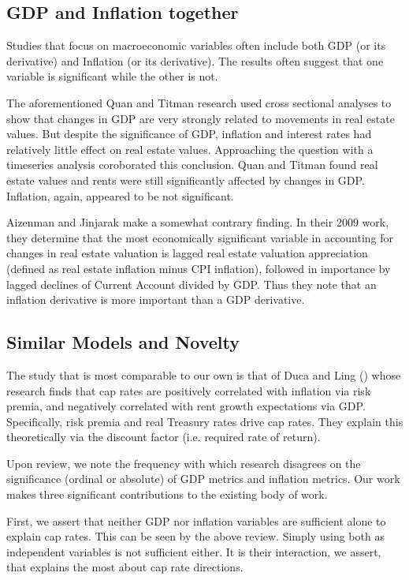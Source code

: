 \subsection{GDP and Inflation together}

Studies that focus on macroeconomic variables often include both GDP (or its derivative) and Inflation (or its derivative). The results often suggest that one variable is significant while the other is not. 

The aforementioned Quan and Titman research used cross sectional analyses to show that changes in GDP are very strongly related to movements in real estate values. But despite the significance of GDP, inflation and interest rates had relatively little effect on real estate values. Approaching the question with a timeseries analysis coroborated this conclusion. Quan and Titman found real estate values and rents were still significantly affected by changes in GDP. Inflation, again, appeared to be not significant. 

Aizenman and Jinjarak make a somewhat contrary finding. In their 2009 work, \citep*{aizenman2009current} they determine that the most economically significant variable in accounting for changes in real estate valuation is lagged real estate valuation appreciation (defined as real estate inflation minus CPI inflation), followed in importance by lagged declines of Current Account divided by GDP. Thus they note that an inflation derivative is more important than a GDP derivative. 

\subsection{Similar Models and Novelty}

The study that is most comparable to our own is that of Duca and Ling (\citeyear{duca2017taxes}) whose research finds that cap rates are positively correlated with inflation via risk premia, and negatively correlated with rent growth expectations via GDP. Specifically, risk premia and real Treasury rates drive cap rates. They explain this theoretically via the discount factor (i.e. required rate of return).

Upon review, we note the frequency with which research disagrees on the significance (ordinal or absolute) of GDP metrics and inflation metrics. Our work makes three significant contributions to the existing body of work. 

First, we assert that neither GDP nor inflation variables are sufficient alone to explain cap rates. This can be seen by the above review. Simply using both as independent variables is not sufficient either. It is their interaction, we assert, that explains the most about cap rate directions. 


